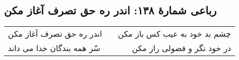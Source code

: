 \begin{center}
\section*{رباعی شمارهٔ ۱۳۸: اندر ره حق تصرف آغاز مکن}
\label{sec:138}
\begin{longtable}{l p{0.5cm} r}
اندر ره حق تصرف آغاز مکن
&&
چشم بد خود به عیب کس باز مکن
\\
سّر همه بندگان خدا می داند 
&&
در خود نگر و فضولی راز مکن
\\
\end{longtable}
\end{center}
